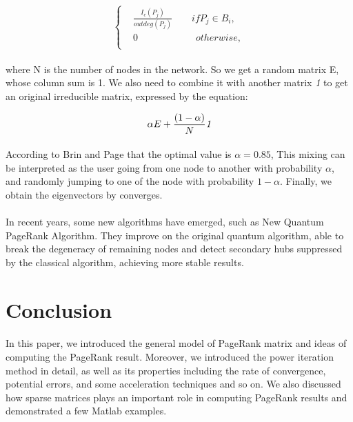 \documentclass[12pt]{article}
\begin{document}
\begin{equation*}
  \left\{
    \begin{aligned}
      & \frac{I_c(P_j)}{outdeg(P_j)}\qquad  if P_j \in B_i,\\
      & 0       \qquad\qquad\qquad otherwise, \\
    \end{aligned}
  \right.
\end{equation*}

\paragraph{} where N is the number of nodes in the network. So we get a random matrix E, whose column sum is 1. We also need to combine it with another matrix \emph{1} to get an original irreducible matrix, expressed by the equation:

\begin{equation*}
  \alpha E + \frac{(1-\alpha)}{N} \emph{1}
\end{equation*}

\paragraph{} According to Brin and Page that the optimal value is $\alpha = 0.85$, This mixing can be interpreted as the user going from one node to another with probability $\alpha$, and randomly jumping to one of the node with probability $1-\alpha$. Finally, we obtain the eigenvectors by converges.

\paragraph{} In recent years, some new algorithms have emerged, such as New Quantum PageRank Algorithm. They improve on the original quantum algorithm, able to break the degeneracy of remaining nodes and detect secondary hubs suppressed by the classical algorithm, achieving more stable results.

\section{Conclusion}
\paragraph{} In this paper, we introduced the general model of PageRank matrix and ideas of computing the PageRank result. Moreover, we introduced the power iteration method in detail, as well as its properties including the rate of convergence, potential errors, and some acceleration techniques and so on. We also discussed how sparse matrices plays an important role in computing PageRank results and demonstrated a few Matlab examples.
\end{document}
